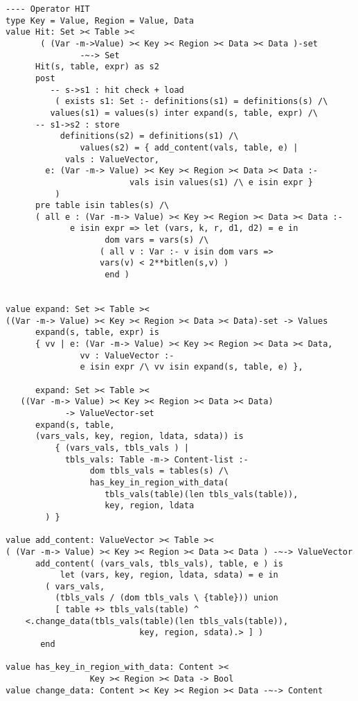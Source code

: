 \begin{lstlisting}
---- Operator HIT
type Key = Value, Region = Value, Data
value Hit: Set >< Table ><
       ( (Var -m->Value) >< Key >< Region >< Data >< Data )-set
               -~-> Set
      Hit(s, table, expr) as s2
      post
         -- s->s1 : hit check + load
          ( exists s1: Set :- definitions(s1) = definitions(s) /\
         values(s1) = values(s) inter expand(s, table, expr) /\
	  -- s1->s2 : store
	       definitions(s2) = definitions(s1) /\
               values(s2) = { add_content(vals, table, e) |
			vals : ValueVector,
        e: (Var -m-> Value) >< Key >< Region >< Data >< Data :-
                         vals isin values(s1) /\ e isin expr }
          )
      pre table isin tables(s) /\
	  ( all e : (Var -m-> Value) >< Key >< Region >< Data >< Data :-
             e isin expr => let (vars, k, r, d1, d2) = e in
                    dom vars = vars(s) /\
                   ( all v : Var :- v isin dom vars =>
                   vars(v) < 2**bitlen(s,v) )
					end )


value expand: Set >< Table ><
((Var -m-> Value) >< Key >< Region >< Data >< Data)-set -> Values
      expand(s, table, expr) is
      { vv | e: (Var -m-> Value) >< Key >< Region >< Data >< Data,
               vv : ValueVector :-
               e isin expr /\ vv isin expand(s, table, e) },

      expand: Set >< Table ><
   ((Var -m-> Value) >< Key >< Region >< Data >< Data)
            -> ValueVector-set
      expand(s, table,
      (vars_vals, key, region, ldata, sdata)) is
          { (vars_vals, tbls_vals ) |
            tbls_vals: Table -m-> Content-list :-
                 dom tbls_vals = tables(s) /\
                 has_key_in_region_with_data(
                    tbls_vals(table)(len tbls_vals(table)),
                    key, region, ldata
		) }

value add_content: ValueVector >< Table ><
( (Var -m-> Value) >< Key >< Region >< Data >< Data ) -~-> ValueVector
      add_content( (vars_vals, tbls_vals), table, e ) is
           let (vars, key, region, ldata, sdata) = e in
		( vars_vals,
		  (tbls_vals / (dom tbls_vals \ {table})) union
		  [ table +> tbls_vals(table) ^
    <.change_data(tbls_vals(table)(len tbls_vals(table)),
                           key, region, sdata).> ] )
	   end

value has_key_in_region_with_data: Content ><
                 Key >< Region >< Data -> Bool
value change_data: Content >< Key >< Region >< Data -~-> Content



\end{lstlisting}
